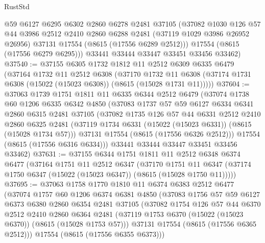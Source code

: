 \begin{lexlean}{RustStd}
\begin{coremodule}
        @59
        @6127
        @6295
        @6302
        @2860
        @6278
        @2481
        @37105
        (@37082
          @1030
          @126
          @57
          @44
          @3986
          @2512
          @2410
          @2860
          @6288
          @2481
          (@37119 @1029 @3986 @26952 @26956)
          @37131
          @17554
          (@8615 (@17556 @6289 @2512)))
        @17554
        (@8615 (@17556 @6279 @6295)))
      @33441
      @33444
      @33447
      @33451
      @33456
      @33462)
@37540 := @37155
    @6305
    @1732
    @1812
    @11
    @2512
    @6309
    @6335
    @6479
    (@37164
      @1732
      @11
      @2512
      @6308
      (@37170
        @1732
        @11
        @6308
        (@37174 @1731 @6308 (@15022 (@15023 @6308)) (@8615 (@15028 @1731 @11)))))
@37604 := @37063
    @1739
    @1751
    @1811
    @11
    @6335
    @6344
    @2512
    @6479
    (@37074
      @1738
      @60
      @1206
      @6335
      @6342
      @4850
      (@37083
        @1737
        @57
        @59
        @6127
        @6334
        @6341
        @2860
        @6315
        @2481
        @37105
        (@37082
          @1735
          @126
          @57
          @44
          @6331
          @2512
          @2410
          @2860
          @6325
          @2481
          (@37119 @1734 @6331 (@15022 (@15023 @6331)) (@8615 (@15028 @1734 @57)))
          @37131
          @17554
          (@8615 (@17556 @6326 @2512)))
        @17554
        (@8615 (@17556 @6316 @6334)))
      @33441
      @33444
      @33447
      @33451
      @33456
      @33462)
@37631 := @37155
    @6344
    @1751
    @1811
    @11
    @2512
    @6348
    @6374
    @6477
    (@37164
      @1751
      @11
      @2512
      @6347
      (@37170
        @1751
        @11
        @6347
        (@37174 @1750 @6347 (@15022 (@15023 @6347)) (@8615 (@15028 @1750 @11)))))
@37695 := @37063
    @1758
    @1770
    @1810
    @11
    @6374
    @6383
    @2512
    @6477
    (@37074
      @1757
      @60
      @1206
      @6374
      @6381
      @4850
      (@37083
        @1756
        @57
        @59
        @6127
        @6373
        @6380
        @2860
        @6354
        @2481
        @37105
        (@37082
          @1754
          @126
          @57
          @44
          @6370
          @2512
          @2410
          @2860
          @6364
          @2481
          (@37119 @1753 @6370 (@15022 (@15023 @6370)) (@8615 (@15028 @1753 @57)))
          @37131
          @17554
          (@8615 (@17556 @6365 @2512)))
        @17554
        (@8615 (@17556 @6355 @6373)))

\end{coremodule}
\end{lexlean}
